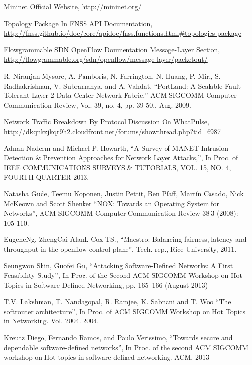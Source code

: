 \begin{thebibliography}{1}
Mininet Official Website, \url{http://mininet.org/}

Topology Package In FNSS API Documentation, \url{http://fnss.github.io/doc/core/apidoc/fnss.functions.html#topologies-package}

Flowgrammable SDN OpenFlow Doumentation Message-Layer Section, \url{http://flowgrammable.org/sdn/openflow/message-layer/packetout/}

R. Niranjan Mysore, A. Pamboris, N. Farrington, N. Huang, P. Miri, S. Radhakrishnan, V. Subramanya, and A. Vahdat,
``PortLand: A Scalable Fault-Tolerant Layer 2 Data Center Network Fabric,'' ACM SIGCOMM Computer Communication Review, Vol. 39, no. 4, pp. 39-50., Aug. 2009.

Network Traffic Breakdown By Protocol Discussion On WhatPulse, \url{http://dkqnkzjkqr9h2.cloudfront.net/forums/showthread.php?tid=6987}







Adnan Nadeem and Michael P. Howarth,
``A Survey of MANET Intrusion Detection \& Prevention Approaches for Network Layer Attacks,'', In Proc. of IEEE COMMUNICATIONS SURVEYS \& TUTORIALS, VOL. 15, NO. 4, FOURTH QUARTER 2013.

Natasha Gude, Teemu Koponen, Justin Pettit, Ben Pfaff, Martín Casado, Nick McKeown and Scott Shenker
``NOX: Towards an Operating System for Networks'', ACM SIGCOMM Computer Communication Review 38.3 (2008): 105-110.

EugeneNg, ZhengCai AlanL Cox TS.,
``Maestro: Balancing fairness, latency and throughput in the openflow control plane'', Tech. rep., Rice University, 2011.

Seungwon Shin, Guofei Gu, 
``Attacking Software-Defined Networks: A First Feasibility Study'', In Proc. of the Second ACM SIGCOMM Workshop on Hot Topics in Software Defined Networking, pp. 165–166 (August 2013)

T.V. Lakshman, T. Nandagopal, R. Ramjee, K. Sabnani and T. Woo
``The softrouter architecture'', In Proc. of ACM SIGCOMM Workshop on Hot Topics in Networking. Vol. 2004. 2004.

Kreutz Diego, Fernando Ramos, and Paulo Verissimo, 
``Towards secure and dependable software-defined networks'', In Proc. of the second ACM SIGCOMM workshop on Hot topics in software defined networking. ACM, 2013.



\end{thebibliography}
